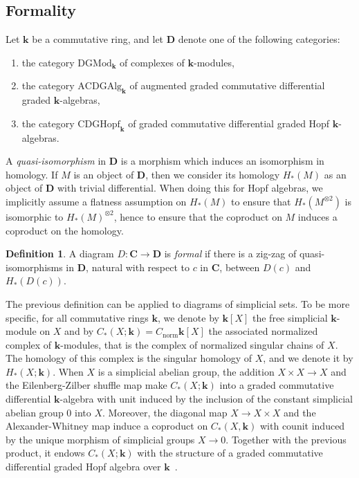 \documentclass{amsart}
\theoremstyle{definition}
\newtheorem{definition}[formula]{Definition}
\theoremstyle{remark}
\newcommand{\Cc}{\mathbf{C}}
\newcommand{\Dd}{\mathbf{D}}
\def\k{\mathbf{k}}
\begin{document}
\subsection{Formality}
Let $\k$ be a commutative ring, and let $\Dd$ denote one of the following categories: 
\begin{enumerate}
	\item[(1)] the category
	$\mathrm{DGMod}_\k$ of complexes of $\k$-modules, 
	\item[(2)] the category $\mathrm{ACDGAlg}_\k$ of augmented graded commutative differential graded $\k$-algebras, 
	\item[(3)] the category $\mathrm{CDGHopf}_\k$ of graded commutative differential graded Hopf $\k$-algebras.
\end{enumerate}
A \emph{quasi-isomorphism} in $\Dd$ is a morphism which induces an isomorphism in homology. 
If $M$ is an object of $\Dd$, then we consider its homology $H_*(M)$ as an object of $\Dd$ with trivial differential. When doing this for Hopf algebras, we implicitly assume a flatness assumption on $H_*(M)$ to ensure that  $H_*(M^{\otimes 2})$ is isomorphic to $H_*(M)^{\otimes 2}$, hence to ensure that the coproduct on $M$ induces a coproduct on the homology.
\begin{definition}\label{defi:formality} 
	A diagram $D:\Cc\to \Dd$ is \emph{formal}
	if there is a zig-zag of quasi-isomorphisms in $\Dd$, natural with respect to $c$ in $\Cc$, between $D(c)$ and $H_*(D(c))$.
\end{definition}

The previous definition can be applied to diagrams of simplicial sets. To be more specific, for all commutative rings $\k$, we denote by $\k[X]$ the free simplicial $\k$-module on $X$ and by $C_*(X;\k)=C_{\mathrm{norm}}\k[X]$ the associated normalized complex of $\k$-modules, that is the complex of normalized singular chains of $X$. The homology of this complex is the singular homology of $X$, and we denote it by $H_*(X;\k)$.
When $X$ is a simplicial abelian group, the addition $X\times X\to X$ and the Eilenberg-Zilber shuffle map 
make $C_*(X;\k)$ into a graded commutative differential $\k$-algebra with unit induced by the inclusion of the constant simplicial abelian group $0$ into $X$. Moreover, the diagonal map $X\to X\times X$  and the Alexander-Whitney map 
induce a coproduct on $C_*(X,\k)$ with counit induced by the unique morphism of simplicial groups $X\to 0$. Together with the previous product, it endows $C_*(X;\k)$ with the structure of a graded commutative differential graded Hopf algebra over $\k$~\cite[Corollary~A.7]{gu-ma-74}. 
	
\end{document}

